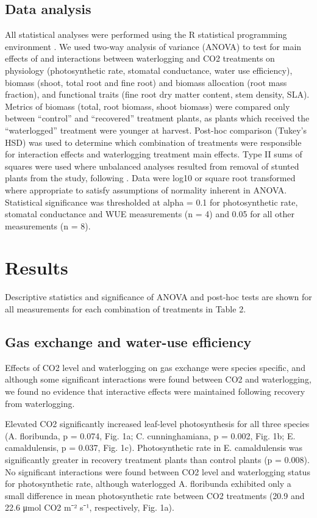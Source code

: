 \documentclass[12pt,a4paper]{memoir}
\begin{document}
\subsection*{Data analysis}
All statistical analyses were performed using the R statistical programming environment  \citep{RCoreTeam2015}. We used two-way analysis of variance (ANOVA) to test for main effects of and interactions between waterlogging and CO2 treatments on physiology (photosynthetic rate, stomatal conductance, water use efficiency), biomass (shoot, total root and fine root) and biomass allocation (root mass fraction), and functional traits (fine root dry matter content, stem density, SLA). Metrics of biomass (total, root biomass, shoot biomass) were compared only between “control” and “recovered” treatment plants, as plants which received the “waterlogged” treatment were younger at harvest. Post-hoc comparison (Tukey’s HSD) was used to determine which combination of treatments were responsible for interaction effects and waterlogging treatment main effects. Type II sums of squares were used where unbalanced analyses resulted from removal of stunted plants from the study, following \citep{Lansgrud2003}. Data were log10 or square root transformed where appropriate to satisfy assumptions of normality inherent in ANOVA. Statistical significance was thresholded at alpha = 0.1 for photosynthetic rate, stomatal conductance and WUE measurements (n = 4) and 0.05 for all other measurements (n = 8).

\newpage

\section{Results}
Descriptive statistics and significance of ANOVA and post-hoc tests are shown for all measurements for each combination of treatments in Table 2. 

\subsection*{Gas exchange and water-use efficiency}
Effects of CO2 level and waterlogging on gas exchange were species specific, and although some significant interactions were found between CO2 and waterlogging, we found no evidence that interactive effects were maintained following recovery from waterlogging. 

Elevated CO2 significantly increased leaf-level photosynthesis for all three species (A. floribunda, p = 0.074, Fig. 1a; C. cunninghamiana, p = 0.002, Fig. 1b; E. camaldulensis, p = 0.037, Fig. 1c). Photosynthetic rate in E. camaldulensis was significantly greater in recovery treatment plants than control plants (p = 0.008). No significant interactions were found between CO2 level and waterlogging status for photosynthetic rate, although waterlogged A. floribunda exhibited only a small difference in mean photosynthetic rate between CO2 treatments (20.9 and 22.6 μmol CO2 m⁻² s⁻¹, respectively, Fig. 1a).
\end{document}
